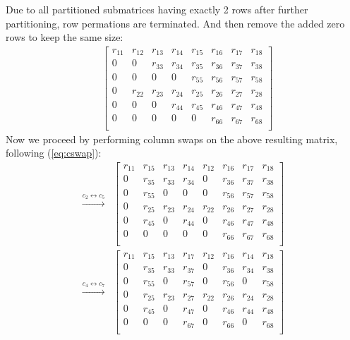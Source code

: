 \documentclass[12pt]{article}
\numberwithin{equation}{section}
\begin{document}
Due to all partitioned submatrices having exactly 2 rows after further partitioning, row permations are terminated. And then remove the added zero rows to keep the same size:
\begin{align*}
&\begin{bmatrix}
 r_{11} & r_{12} & r_{13} & r_{14} & r_{15} & r_{16} & r_{17} & r_{18}\\
 0      & 0      & r_{33} & r_{34} & r_{35} & r_{36} & r_{37} & r_{38}\\
 0      & 0      & 0      & 0      & r_{55} & r_{56} & r_{57} & r_{58}\\
 0      & r_{22} & r_{23} & r_{24} & r_{25} & r_{26} & r_{27} & r_{28}\\
 0      & 0      & 0      & r_{44} & r_{45} & r_{46} & r_{47} & r_{48}\\
 0      & 0      & 0      & 0      & 0      & r_{66} & r_{67} & r_{68}\\
\end{bmatrix}
\end{align*}
Now we proceed by performing column swaps on the above resulting matrix, following (\ref{eq:cswap}):
\begin{align*}
\xrightarrow{c_{2} \leftrightarrow c_{5}}
&\begin{bmatrix}
 r_{11} & r_{15} & r_{13} & r_{14} &  r_{12} & r_{16} & r_{17} & r_{18}\\
 0      & r_{35} & r_{33} & r_{34} &  0      & r_{36} & r_{37} & r_{38}\\
 0      & r_{55} & 0      & 0      &  0      & r_{56} & r_{57} & r_{58}\\
 0      & r_{25} & r_{23} & r_{24} &  r_{22} & r_{26} & r_{27} & r_{28}\\
 0      & r_{45} & 0      & r_{44} &  0      & r_{46} & r_{47} & r_{48}\\
 0      & 0      & 0      & 0      &  0      & r_{66} & r_{67} & r_{68}\\
\end{bmatrix}
\end{align*}
\begin{align*}
\xrightarrow{c_{4} \leftrightarrow c_{7}}
&\begin{bmatrix}
 r_{11} & r_{15} & r_{13} & r_{17} & r_{12} & r_{16} & r_{14} & r_{18}\\
 0      & r_{35} & r_{33} & r_{37} & 0      & r_{36} & r_{34} & r_{38}\\
 0      & r_{55} & 0      & r_{57} & 0      & r_{56} & 0      & r_{58}\\
 0      & r_{25} & r_{23} & r_{27} & r_{22} & r_{26} & r_{24} & r_{28}\\
 0      & r_{45} & 0      & r_{47} & 0      & r_{46} & r_{44} & r_{48}\\
 0      & 0      & 0      & r_{67} & 0      & r_{66} & 0      & r_{68}\\
\end{bmatrix}\end{align*}
\end{document}
